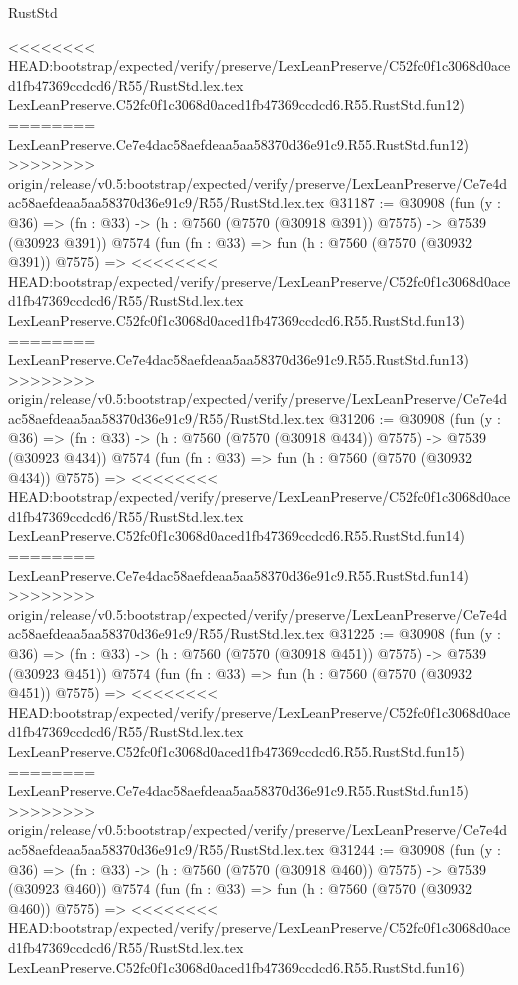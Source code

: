 \begin{lexlean}{RustStd}
\begin{coremodule}
{\begin{coremodule}
{{{{{{{{{{{{{{{{{{{{{{{{{{{{{{{{{{{{{{{{{{{<<<<<<<< HEAD:bootstrap/expected/verify/preserve/LexLeanPreserve/C52fc0f1c3068d0aced1fb47369ccdcd6/R55/RustStd.lex.tex
    LexLeanPreserve.C52fc0f1c3068d0aced1fb47369ccdcd6.R55.RustStd.fun12)
========
    LexLeanPreserve.Ce7e4dac58aefdeaa5aa58370d36e91c9.R55.RustStd.fun12)
>>>>>>>> origin/release/v0.5:bootstrap/expected/verify/preserve/LexLeanPreserve/Ce7e4dac58aefdeaa5aa58370d36e91c9/R55/RustStd.lex.tex
@31187 := @30908
    (fun (y : @36) => (fn : @33) -> (h : @7560 (@7570 (@30918 @391)) @7575) -> @7539 (@30923 @391))
    @7574
    (fun (fn : @33) =>
    fun (h : @7560 (@7570 (@30932 @391)) @7575) =>
<<<<<<<< HEAD:bootstrap/expected/verify/preserve/LexLeanPreserve/C52fc0f1c3068d0aced1fb47369ccdcd6/R55/RustStd.lex.tex
    LexLeanPreserve.C52fc0f1c3068d0aced1fb47369ccdcd6.R55.RustStd.fun13)
========
    LexLeanPreserve.Ce7e4dac58aefdeaa5aa58370d36e91c9.R55.RustStd.fun13)
>>>>>>>> origin/release/v0.5:bootstrap/expected/verify/preserve/LexLeanPreserve/Ce7e4dac58aefdeaa5aa58370d36e91c9/R55/RustStd.lex.tex
@31206 := @30908
    (fun (y : @36) => (fn : @33) -> (h : @7560 (@7570 (@30918 @434)) @7575) -> @7539 (@30923 @434))
    @7574
    (fun (fn : @33) =>
    fun (h : @7560 (@7570 (@30932 @434)) @7575) =>
<<<<<<<< HEAD:bootstrap/expected/verify/preserve/LexLeanPreserve/C52fc0f1c3068d0aced1fb47369ccdcd6/R55/RustStd.lex.tex
    LexLeanPreserve.C52fc0f1c3068d0aced1fb47369ccdcd6.R55.RustStd.fun14)
========
    LexLeanPreserve.Ce7e4dac58aefdeaa5aa58370d36e91c9.R55.RustStd.fun14)
>>>>>>>> origin/release/v0.5:bootstrap/expected/verify/preserve/LexLeanPreserve/Ce7e4dac58aefdeaa5aa58370d36e91c9/R55/RustStd.lex.tex
@31225 := @30908
    (fun (y : @36) => (fn : @33) -> (h : @7560 (@7570 (@30918 @451)) @7575) -> @7539 (@30923 @451))
    @7574
    (fun (fn : @33) =>
    fun (h : @7560 (@7570 (@30932 @451)) @7575) =>
<<<<<<<< HEAD:bootstrap/expected/verify/preserve/LexLeanPreserve/C52fc0f1c3068d0aced1fb47369ccdcd6/R55/RustStd.lex.tex
    LexLeanPreserve.C52fc0f1c3068d0aced1fb47369ccdcd6.R55.RustStd.fun15)
========
    LexLeanPreserve.Ce7e4dac58aefdeaa5aa58370d36e91c9.R55.RustStd.fun15)
>>>>>>>> origin/release/v0.5:bootstrap/expected/verify/preserve/LexLeanPreserve/Ce7e4dac58aefdeaa5aa58370d36e91c9/R55/RustStd.lex.tex
@31244 := @30908
    (fun (y : @36) => (fn : @33) -> (h : @7560 (@7570 (@30918 @460)) @7575) -> @7539 (@30923 @460))
    @7574
    (fun (fn : @33) =>
    fun (h : @7560 (@7570 (@30932 @460)) @7575) =>
<<<<<<<< HEAD:bootstrap/expected/verify/preserve/LexLeanPreserve/C52fc0f1c3068d0aced1fb47369ccdcd6/R55/RustStd.lex.tex
    LexLeanPreserve.C52fc0f1c3068d0aced1fb47369ccdcd6.R55.RustStd.fun16)
}}}}}}}}}}}}}}}}}}}}}}}}}}}}}}}}}}}}}}}}}}}
\end{coremodule}}
\end{coremodule}
\end{lexlean}
